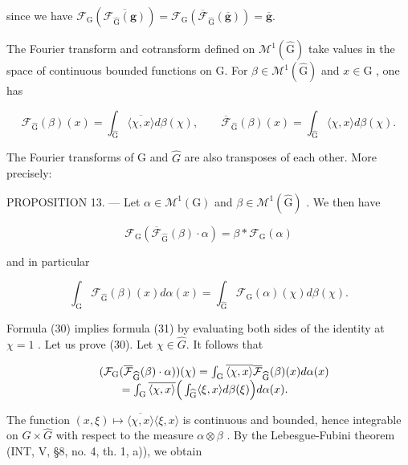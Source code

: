 since we have \(\mathcal{F}_{\mathrm{G}}(\overline{\mathcal{F}_{\widehat{\mathrm{G}}}(\boldsymbol{g})}) = \mathcal{F}_{\mathrm{G}}(\overline{\mathcal{F}}_{\widehat{\mathrm{G}}}(\overline{\boldsymbol{g}})) = \overline{\boldsymbol{g}}.\)

The Fourier transform and cotransform defined on \(\mathcal{M}^{1}(\widehat{\mathrm{G}})\) take values in the space of continuous bounded functions on G. For \(\beta\in\mathcal{M}^{1}(\widehat{\mathrm{G}})\) and \(x\in\mathrm{G}\) , one has

\[
\mathcal {F} _ {\widehat {\mathrm{G}}} (\beta) (x) = \int_ {\widehat {\mathrm{G}}} \overline {{\langle \chi , x \rangle}} d \beta (\chi), \qquad \overline {{\mathcal {F}}} _ {\widehat {\mathrm{G}}} (\beta) (x) = \int_ {\widehat {\mathrm{G}}} \langle \chi , x \rangle d \beta (\chi).
\]

The Fourier transforms of G and \(\widehat{G}\) are also transposes of each other. More precisely:

PROPOSITION 13. --- Let \(\alpha \in \mathcal{M}^{1}(\mathrm{G})\) and \(\beta \in \mathcal{M}^{1}(\widehat{\mathrm{G}})\) . We then have

\[
\mathcal {F} _ {\mathrm{G}} (\overline {{\mathcal {F}}} _ {\widehat {\mathrm{G}}} (\beta) \cdot \alpha) = \beta * \mathcal {F} _ {\mathrm{G}} (\alpha)\tag{30}
\]

and in particular

\[
\int_ {\mathrm{G}} \mathcal {F} _ {\widehat {\mathrm{G}}} (\beta) (x) d \alpha (x) = \int_ {\widehat {\mathrm{G}}} \mathcal {F} _ {\mathrm{G}} (\alpha) (\chi) d \beta (\chi).\tag{31}
\]

Formula (30) implies formula (31) by evaluating both sides of the identity at \(\chi = 1\) . Let us prove (30). Let \(\chi \in \widehat{G}\). It follows that

\[
\begin{array}{r l} & {(\mathcal {F} _ {\mathrm{G}} (\overline {{\mathcal {F}}} _ {\widehat {\mathrm{G}}} (\beta) \cdot \alpha)) (\chi) = \int_ {\mathrm{G}} \overline {{\langle \chi , x \rangle}} \overline {{\mathcal {F}}} _ {\widehat {\mathrm{G}}} (\beta) (x) d \alpha (x)} \\ & {\qquad = \int_ {\mathrm{G}} \overline {{\langle \chi , x \rangle}} \Big (\int_ {\widehat {\mathrm{G}}} \langle \xi , x \rangle d \beta (\xi) \Big) d \alpha (x).} \end{array}
\]

The function \((x,\xi)\mapsto\overline{\langle\chi,x\rangle}\langle\xi,x\rangle\) is continuous and bounded, hence integrable on \(G\times\widehat{G}\) with respect to the measure \(\alpha\otimes\beta\) . By the Lebesgue-Fubini theorem (INT, V, §8, no. 4, th. 1, a)), we obtain

